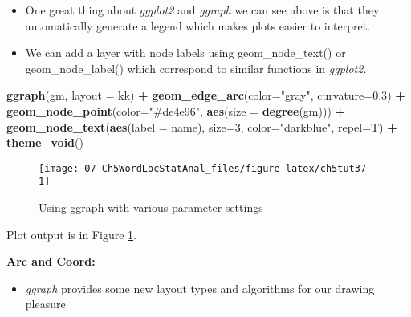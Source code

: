 \documentclass[
]{article}
\newenvironment{Shaded}{\begin{snugshade}}{\end{snugshade}}
\newcommand{\AttributeTok}[1]{\textcolor[rgb]{0.13,0.29,0.53}{#1}}
\newcommand{\DecValTok}[1]{\textcolor[rgb]{0.00,0.00,0.81}{#1}}
\newcommand{\FloatTok}[1]{\textcolor[rgb]{0.00,0.00,0.81}{#1}}
\newcommand{\FunctionTok}[1]{\textcolor[rgb]{0.13,0.29,0.53}{\textbf{#1}}}
\newcommand{\NormalTok}[1]{#1}
\newcommand{\SpecialCharTok}[1]{\textcolor[rgb]{0.81,0.36,0.00}{\textbf{#1}}}
\newcommand{\StringTok}[1]{\textcolor[rgb]{0.31,0.60,0.02}{#1}}
\providecommand{\tightlist}{%
  \setlength{\itemsep}{0pt}\setlength{\parskip}{0pt}}
\begin{document}
\begin{itemize}
\tightlist
\item
  One great thing about \emph{ggplot2} and \emph{ggraph} we can see above is that they automatically generate a legend which makes plots easier to interpret.
\item
  We can add a layer with node labels using geom\_node\_text() or geom\_node\_label() which correspond to similar functions in \emph{ggplot2}.
\end{itemize}

\begin{Shaded}
\begin{Highlighting}[]
\FunctionTok{ggraph}\NormalTok{(gm,  }\AttributeTok{layout =} \StringTok{\textquotesingle{}kk\textquotesingle{}}\NormalTok{) }\SpecialCharTok{+}
  \FunctionTok{geom\_edge\_arc}\NormalTok{(}\AttributeTok{color=}\StringTok{"gray"}\NormalTok{, }\AttributeTok{curvature=}\FloatTok{0.3}\NormalTok{) }\SpecialCharTok{+}            
  \FunctionTok{geom\_node\_point}\NormalTok{(}\AttributeTok{color=}\StringTok{"\#de4e96"}\NormalTok{, }\FunctionTok{aes}\NormalTok{(}\AttributeTok{size =} \FunctionTok{degree}\NormalTok{(gm))) }\SpecialCharTok{+}     
  \FunctionTok{geom\_node\_text}\NormalTok{(}\FunctionTok{aes}\NormalTok{(}\AttributeTok{label =}\NormalTok{ name), }\AttributeTok{size=}\DecValTok{3}\NormalTok{, }\AttributeTok{color=}\StringTok{"darkblue"}\NormalTok{, }
                 \AttributeTok{repel=}\NormalTok{T) }\SpecialCharTok{+}
  \FunctionTok{theme\_void}\NormalTok{()}
\end{Highlighting}
\end{Shaded}

\begin{figure}

{\centering \texttt{[image: 07-Ch5WordLocStatAnal\_files/figure-latex/ch5tut37-1]} 

}

\caption{Using ggraph with various parameter settings}\label{fig:ch5tut37}
\end{figure}

Plot output is in Figure \ref{fig:ch5tut37}.

\textbf{Arc and Coord:}

\begin{itemize}
\tightlist
\item
  \emph{ggraph} provides some new layout types and algorithms for our drawing pleasure
\end{itemize}
\end{document}

